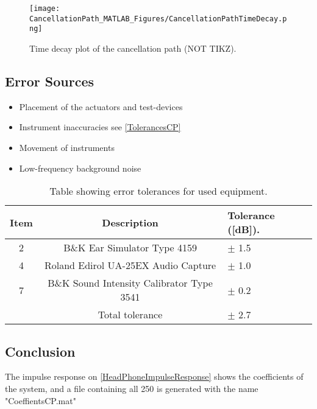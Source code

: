 \begin{figure}[H]
	\centering
	\texttt{[image: CancellationPath\_MATLAB\_Figures/CancellationPathTimeDecay.png]}
	\caption{Time decay plot of the cancellation path (NOT TIKZ).}
	\label{TimeDecayPlotCancellationPath}
\end{figure}


%	

\subsection{Error Sources}
\begin{itemize}
	\item Placement of the actuators and test-devices
	\item Instrument inaccuracies see \autoref{TolerancesCP}
	\item Movement of instruments
	\item Low-frequency background noise
\end{itemize}

\begin{table}[h]
	\centering
	\begin{tabular}{ c c l } \toprule
		{Item}	& 		{Description} 	& {Tolerance ([dB])}.	 \\ \bottomrule 
		2	&	B\&K Ear Simulator Type 4159				& $\pm$ 1.5 	\\
		4	&	Roland Edirol UA-25EX Audio Capture			& $\pm$ 1.0	\\
		7	&	B\&K Sound Intensity Calibrator Type 3541	& $\pm$ 0.2	\\ \bottomrule
			&	Total tolerance								& $\pm$ 2.7	\\ \bottomrule	
	\end{tabular}
	\caption{Table showing error tolerances for used equipment.}
	\label{TolerancesCP}
\end{table}

\subsection{Conclusion}
The impulse response on \autoref{HeadPhoneImpulseResponse} shows the coefficients of the system, and a file containing all 250 is generated with the name "CoeffientsCP.mat"